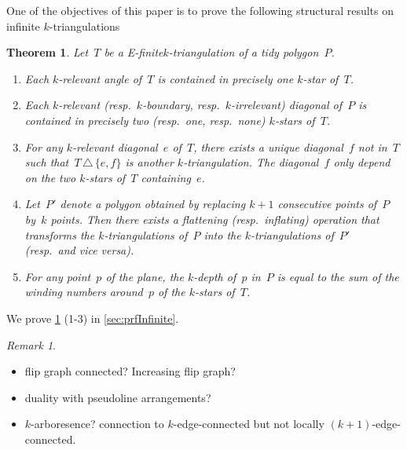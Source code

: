 \documentclass{amsart}
\newtheorem{theorem}{Theorem}[section]
\theoremstyle{remark}
\newtheorem{remark}{Remark}[section]
\newcommand{\symdif}{\,\triangle\,} %
\newcommand{\viceversa}{\textit{vice versa}} %
\newcommand*{\ef}[0]{E-finite\xspace}
\newcommand*{\ktg}[0]{$k$-triangulation\xspace}
\newcommand{\vincent}[1]{\todo[color=blue!30]{#1 \\ \hfill --- V.}}
\begin{document}
One of the objectives of this paper is to prove the following structural results on infinite $k$-triangulations

\begin{theorem}
\label{thm:structureInfinite}
Let~$T$ be a \ef \ktg of a tidy polygon~$P$.
\begin{enumerate}
\item Each $k$-relevant angle of~$T$ is contained in precisely one $k$-star of~$T$.
\item Each $k$-relevant (resp.~$k$-boundary, resp.~$k$-irrelevant) diagonal of~$P$ is contained in precisely two (resp.~one, resp.~none) $k$-stars of~$T$.
\item For any $k$-relevant diagonal~$e$ of~$T$, there exists a unique diagonal~$f$ not in~$T$ such that~$T \symdif \{e,f\}$ is another $k$-triangulation. The diagonal~$f$ only depend on the two $k$-stars of~$T$ containing~$e$.
\item Let~$P'$ denote a polygon obtained by replacing $k+1$ consecutive points of~$P$ by~$k$ points. Then there exists a flattening (resp.~inflating) operation that transforms the \ktg{}s of~$P$ into the \ktg{}s of~$P'$ (resp.~and \viceversa).
\item For any point~$p$ of the plane, the $k$-depth of~$p$ in~$P$ is equal to the sum of the winding numbers around~$p$ of the $k$-stars of~$T$.
\vincent{Vrai ?}
\end{enumerate}
\end{theorem}

We prove \cref{thm:structureInfinite} (1-3) in \cref{sec:prfInfinite}.

\begin{remark}
\begin{itemize}
\item flip graph connected? Increasing flip graph?
\item duality with pseudoline arrangements?
\item $k$-arboresence? connection to $k$-edge-connected but not locally $(k+1)$-edge-connected.
\end{itemize}
\end{remark}

\end{document}

